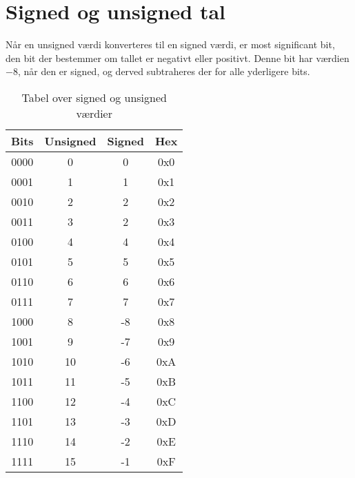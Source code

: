 \section{Signed og unsigned tal}
Når en unsigned værdi konverteres til en signed værdi, er most significant bit, den bit der bestemmer om tallet er negativt eller positivt.
Denne bit har værdien $-8$, når den er signed, og derved subtraheres der for alle yderligere bits.
\begin{table}[h]
    \centering
    \begin{tabular}{c|c|c|c}
        Bits&Unsigned&Signed&Hex\\\hline
        0000&0&0&0x0\\
        0001&1&1&0x1\\
        0010&2&2&0x2\\
        0011&3&2&0x3\\
        0100&4&4&0x4\\
        0101&5&5&0x5\\
        0110&6&6&0x6\\
        0111&7&7&0x7\\
        1000&8&-8&0x8\\
        1001&9&-7&0x9\\
        1010&10&-6&0xA\\
        1011&11&-5&0xB\\
        1100&12&-4&0xC\\
        1101&13&-3&0xD\\
        1110&14&-2&0xE\\
        1111&15&-1&0xF\\
    \end{tabular}
    \caption{Tabel over signed og unsigned værdier}
\end{table}